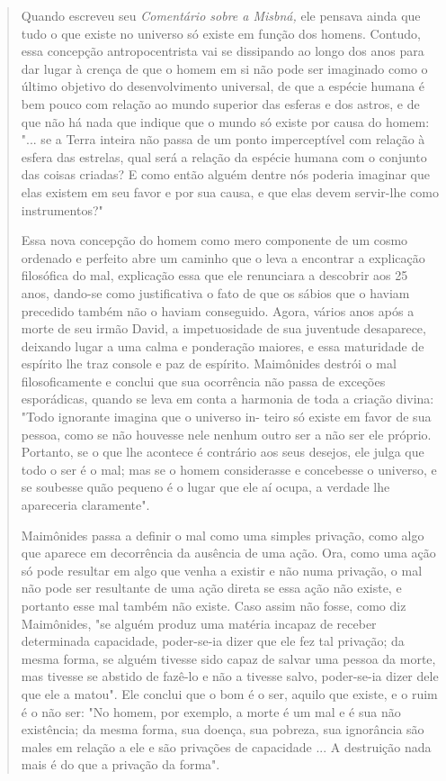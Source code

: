 \begin{quote}
Quando escreveu seu \emph{Comentário sobre a Misbná,} ele pensava ain­da
que tudo o que existe no universo só existe em função dos homens.
Contu­do, essa concepção antropocentrista vai se dissipando ao longo dos
anos para dar lugar à crença de que o homem em si não pode ser imaginado
como o últi­mo objetivo do desenvolvimento universal, de que a espécie
humana é bem pouco com relação ao mundo superior das esferas e dos
astros, e de que não há nada que indique que o mundo só existe por causa
do homem: "... se a Ter­ra inteira não passa de um ponto imperceptível
com relação à esfera das estre­las, qual será a relação da espécie
humana com o conjunto das coisas criadas? E como então alguém dentre nós
poderia imaginar que elas existem em seu fa­vor e por sua causa, e que
elas devem servir-lhe como instrumentos?"

Essa nova concepção do homem como mero componente de um cosmo ordenado e
perfeito abre um caminho que o leva a encontrar a explica­ção filosófica
do mal, explicação essa que ele renunciara a descobrir aos 25 anos,
dando-se como justificativa o fato de que os sábios que o haviam
precedido também não o haviam conseguido. Agora, vários anos após a
morte de seu ir­mão David, a impetuosidade de sua juventude desaparece,
deixando lugar a uma calma e ponderação maiores, e essa maturidade de
espírito lhe traz console e paz de espírito. Maimônides destrói o mal
filosoficamente e conclui que sua ocorrência não passa de exceções
esporádicas, quando se leva em conta a har­monia de toda a criação
divina: "Todo ignorante imagina que o universo in-
teiro só existe em favor de sua pessoa, como se não houvesse nele nenhum
outro ser a não ser ele próprio. Portanto, se o que lhe acontece é
contrário aos seus desejos, ele julga que todo o ser é o mal; mas se o
homem considerasse e concebesse o universo, e se soubesse quão pequeno é
o lugar que ele aí ocu­pa, a verdade lhe apareceria claramente".

Maimônides passa a definir o mal como uma simples privação, co­mo algo
que aparece em decorrência da ausência de uma ação. Ora, como uma ação
só pode resultar em algo que venha a existir e não numa privação, o mal
não pode ser resultante de uma ação direta se essa ação não existe, e
portanto esse mal também não existe. Caso assim não fosse, como diz
Maimônides, "se alguém produz uma matéria incapaz de receber determinada
capacidade, poder-se-ia dizer que ele fez tal privação; da mesma forma,
se alguém tivesse sido ca­paz de salvar uma pessoa da morte, mas tivesse
se abstido de fazê-lo e não a tivesse salvo, poder-se-ia dizer dele que
ele a matou". Ele conclui que o bom é o ser, aquilo que existe, e o ruim
é o não ser: "No homem, por exemplo, a morte é um mal e é sua não
existência; da mesma forma, sua doença, sua po­breza, sua ignorância são
males em relação a ele e são privações de capacidade ... A destruição
nada mais é do que a privação da forma".


\end{quote}
